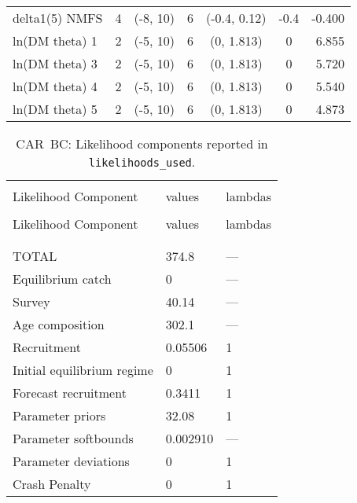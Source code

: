 \begin{table}[!h]
\begin{tabular}{lcccccr}
delta1(5) NMFS & 4 & (-8, 10) & 6 & (-0.4, 0.12) & -0.4 & -0.400 \\
ln(DM theta) 1 & 2 & (-5, 10) & 6 & (0, 1.813) & 0 & 6.855 \\
ln(DM theta) 3 & 2 & (-5, 10) & 6 & (0, 1.813) & 0 & 5.720 \\
ln(DM theta) 4 & 2 & (-5, 10) & 6 & (0, 1.813) & 0 & 5.540 \\
ln(DM theta) 5 & 2 & (-5, 10) & 6 & (0, 1.813) & 0 & 4.873 \\
\hline
\end{tabular}
\usefont{\encodingdefault}{\familydefault}{\seriesdefault}{\shapedefault}\normalsize
\end{table}


\setlength{\tabcolsep}{0pt}
\begin{longtable}[c]{>{\raggedright\let\newline\\\arraybackslash\hspace{0pt}}p{2.31in}>{\raggedleft\let\newline\\\arraybackslash\hspace{0pt}}p{1.35in}>{\raggedleft\let\newline\\\arraybackslash\hspace{0pt}}p{1.35in}}
  \caption{CAR~BC: Likelihood components reported in \texttt{likelihoods\_used}.} \label{tab:car.like1}\\  \hline\\[-2.2ex]  Likelihood Component  & values & lambdas \\[0.2ex]\hline\\[-1.5ex]  \endfirsthead   \hline  Likelihood Component  & values & lambdas \\[0.2ex]\hline\\[-1.5ex]  \endhead  \hline\\[-2.2ex]   \endfoot  \hline \endlastfoot
  TOTAL & 374.8 & --- \\ 
  Equilibrium catch & 0 & --- \\ 
  Survey & 40.14 & --- \\ 
  Age composition & 302.1 & --- \\ 
  Recruitment & 0.05506 & 1 \\ 
  Initial equilibrium regime & 0 & 1 \\ 
  Forecast recruitment & 0.3411 & 1 \\ 
  Parameter priors & 32.08 & 1 \\ 
  Parameter softbounds & 0.002910 & --- \\ 
  Parameter deviations & 0 & 1 \\ 
  Crash Penalty & 0 & 1 \\ 
\end{longtable}\setlength{\tabcolsep}{0pt}

